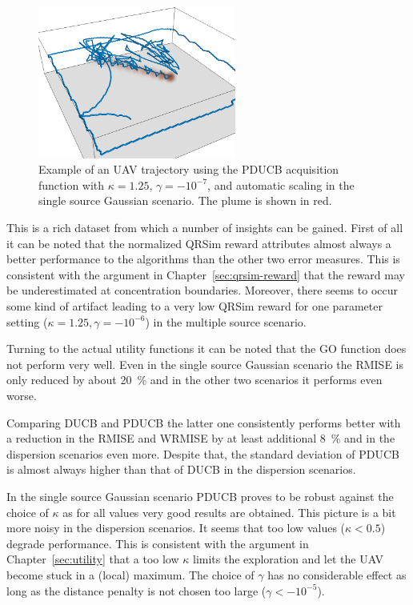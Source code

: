 \begin{figure}
    \centering
    \includegraphics[width=6.5cm]{plots/trajectory}
    \caption[Example of an UAV trajectory]{Example of an UAV trajectory using 
        the PDUCB acquisition function with $\kappa = 1.25$, $\gamma 
        = -10^{-7}$, and automatic scaling in the single source Gaussian 
        scenario. The plume is shown in red.}\label{fig:trajectory}
\end{figure}

This is a rich dataset from which a number of insights can be gained. First of 
all it can be noted that the normalized QRSim reward attributes almost always 
a better performance to the algorithms than the other two error measures.  This 
is consistent with the argument in Chapter~\ref{sec:qrsim-reward} that the 
reward may be underestimated at concentration boundaries. Moreover, there seems 
to occur some kind of artifact leading to a very low QRSim reward for one 
parameter setting ($\kappa = 1.25, \gamma = -10^{-6}$) in the multiple source 
scenario.

Turning to the actual utility functions it can be noted that the GO function 
does not perform very well.  Even in the single source Gaussian scenario the 
RMISE is only reduced by about \SI{20}{\percent} and in the other two scenarios 
it performs even worse.

Comparing DUCB and PDUCB the latter one consistently performs better with 
a reduction in the RMISE and WRMISE by at least additional \SI{8}{\percent} and 
in the dispersion scenarios even more.  Despite that, the standard deviation of 
PDUCB is almost always higher than that of DUCB in the dispersion scenarios.

In the single source Gaussian scenario PDUCB proves to be robust against the 
choice of $\kappa$ as for all values very good results are obtained. This 
picture is a bit more noisy in the dispersion scenarios. It seems that too low 
values ($\kappa < 0.5$) degrade performance. This is consistent with the 
argument in Chapter~\ref{sec:utility} that a too low $\kappa$ limits the 
exploration and let the UAV become stuck in a (local) maximum. The choice of 
$\gamma$ has no considerable effect as long as the distance penalty is not 
chosen too large ($\gamma < -10^{-5}$).


